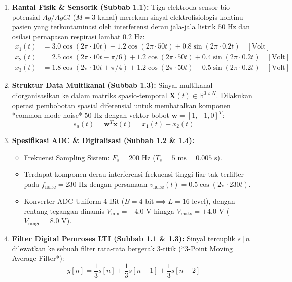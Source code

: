 \documentclass[11pt,a4paper]{article}
\begin{document}
\begin{enumerate}[leftmargin=*]
  \item \textbf{Rantai Fisik \& Sensorik (Subbab 1.1):}  
  Tiga elektroda sensor bio-potensial $Ag/AgCl$ ($M = 3$ kanal) merekam sinyal elektrofisiologis kontinu pasien yang terkontaminasi oleh interferensi derau jala-jala listrik $50\text{ Hz}$ dan osilasi pernapasan respirasi lambat $0.2\text{ Hz}$:
  \begin{align}
  x_1(t) &= 3.0 \cos(2\pi \cdot 10 t) + 1.2 \cos(2\pi \cdot 50 t) + 0.8 \sin(2\pi \cdot 0.2 t) \quad [\text{Volt}] \\
  x_2(t) &= 2.5 \cos(2\pi \cdot 10 t - \pi/6) + 1.2 \cos(2\pi \cdot 50 t) + 0.4 \sin(2\pi \cdot 0.2 t) \quad [\text{Volt}] \\
  x_3(t) &= 1.8 \cos(2\pi \cdot 10 t + \pi/4) + 1.2 \cos(2\pi \cdot 50 t) - 0.5 \sin(2\pi \cdot 0.2 t) \quad [\text{Volt}]
  \end{align}

  \item \textbf{Struktur Data Multikanal (Subbab 1.3):}  
  Sinyal multikanal diorganisasikan ke dalam matriks spasio-temporal $\mathbf{X}(t) \in \mathbb{R}^{3 \times N}$. Dilakukan operasi pembobotan spasial diferensial untuk membatalkan komponen *common-mode noise* $50\text{ Hz}$ dengan vektor bobot $\mathbf{w} = [1, -1, 0]^T$:
  \begin{equation}
  s_a(t) = \mathbf{w}^T \mathbf{x}(t) = x_1(t) - x_2(t)
  \end{equation}

  \item \textbf{Spesifikasi ADC \& Digitalisasi (Subbab 1.2 \& 1.4):}
  \begin{itemize}
    \item Frekuensi Sampling Sistem: $F_s = 200\text{ Hz}$ ($T_s = 5\text{ ms} = 0.005\text{ s}$).
    \item Terdapat komponen derau interferensi frekuensi tinggi liar tak terfilter pada $f_{\text{noise}} = 230\text{ Hz}$ dengan persamaan $v_{\text{noise}}(t) = 0.5 \cos(2\pi \cdot 230 t)$.
    \item Konverter ADC Uniform 4-Bit ($B = 4\text{ bit} \implies L = 16\text{ level}$), dengan rentang tegangan dinamis $V_{\text{min}} = -4.0\text{ V}$ hingga $V_{\text{maks}} = +4.0\text{ V}$ ($V_{\text{range}} = 8.0\text{ V}$).
  \end{itemize}

  \item \textbf{Filter Digital Pemroses LTI (Subbab 1.1 \& 1.3):}  
  Sinyal tercuplik $s[n]$ dilewatkan ke sebuah filter rata-rata bergerak 3-titik (*3-Point Moving Average Filter*):
  \begin{equation}
  y[n] = \frac{1}{3}s[n] + \frac{1}{3}s[n-1] + \frac{1}{3}s[n-2]
  \end{equation}
\end{enumerate}
\end{document}
